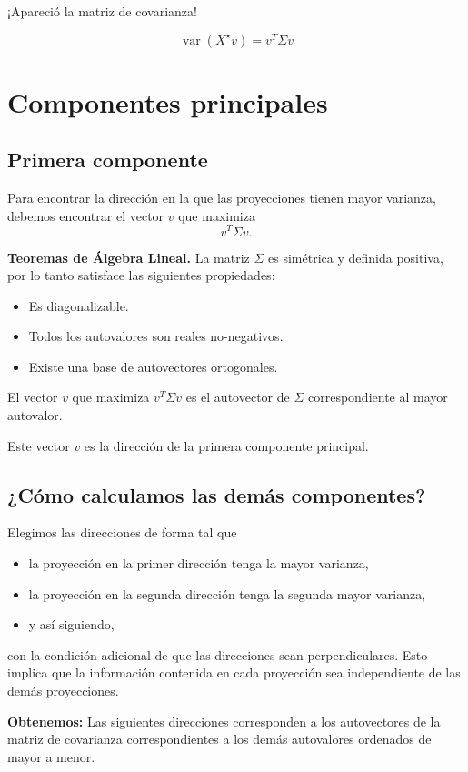 \documentclass[a4paper]{article}
\DeclareMathOperator{\var}{var}
\begin{document}
¡Apareció la matriz de covarianza!

$$
\var(X^\star v) = v^T \Sigma v
$$

\section{Componentes principales}

\subsection{Primera componente}
Para encontrar la dirección en la que las proyecciones tienen mayor varianza, debemos encontrar el vector $v$ que maximiza
$$v^T \Sigma v.$$

\textbf{Teoremas de Álgebra Lineal.} La matriz $\Sigma$ es simétrica y definida positiva, por lo tanto satisface las siguientes propiedades:
\begin{itemize}
\item Es diagonalizable.
\item Todos los autovalores son reales no-negativos.
\item Existe una base de autovectores ortogonales.
\end{itemize}

El vector $v$ que maximiza $v^T \Sigma v$ es el autovector de $\Sigma$ correspondiente al mayor autovalor.

Este vector $v$ es la dirección de la primera componente principal.

\subsection{¿Cómo calculamos las demás componentes?}

Elegimos las direcciones de forma tal que
\begin{itemize}
\item la proyección en la primer dirección tenga la mayor varianza,
\item la proyección en la segunda dirección tenga la segunda mayor varianza,
\item y así siguiendo,
\end{itemize}
con la condición adicional de que las direcciones sean perpendiculares. Esto implica que la información contenida en cada proyección sea independiente de las demás proyecciones.

\textbf{Obtenemos:} Las siguientes direcciones corresponden a los autovectores de la matriz de covarianza correspondientes a los demás autovalores ordenados de mayor a menor.
\end{document}
